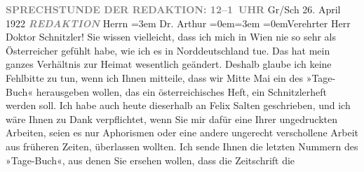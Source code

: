 \begin{ledgroupsized}[t]{13cm}
           \noindent{}\centering{}\textcolor{gray}{\textbf{SPRECHSTUNDE DER REDAKTION: 12–1 UHR}}\pend
           \pstart
           \noindent{}Gr/Sch\pend
           \pstart
           \centering{}26. April 1922\pend
           \pstart
           \textcolor{gray}{\textbf{\emph{REDAKTION}}}\pend
           \pstart
           Herrn\pend
           \leftskip=3em{}\pstart
           \noindent{}Dr. Arthur \pend
           \leftskip=0em{}\leftskip=3em{}\pstart
           \pend
           \leftskip=0em{}\pstart\center{}Verehrter Herr \introOben{}Doktor\introOben{}
                  Schnitzler!\pend\pstart
           Sie wissen vielleicht, dass ich mich in Wien nie so
               sehr als Österreicher gefühlt habe, wie ich es in
                  Norddeutschland tue. Das hat mein ganzes
               Verhältnis zur Heimat wesentlich geändert. Deshalb glaube ich keine Fehlbitte zu tun,
               wenn ich Ihnen mitteile, dass wir Mitte Mai ein \label{K_L02378_1v}\label{K_L02378_1h} des »Tage-Buch«
               herausgeben wollen, das ein österreichisches Heft,
               ein Schnitzlerheft werden soll. Ich habe auch heute dieserhalb an Felix Salten geschrieben, und ich wäre Ihnen zu Dank
               verpflichtet, wenn Sie mir dafür eine Ihrer ungedruckten Arbeiten, seien es nur
               Aphorismen oder eine andere ungerecht verschollene Arbeit aus früheren Zeiten,
               überlassen wollten. Ich sende Ihnen die letzten Nummern des »Tage-Buch«, aus denen Sie ersehen wollen, dass die Zeitschrift die

\end{ledgroupsized}

